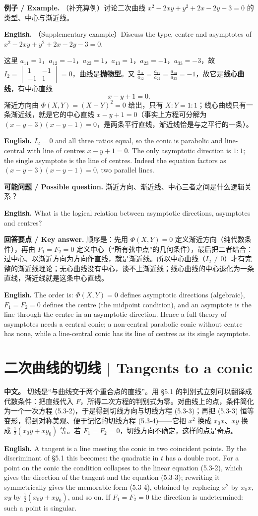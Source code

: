\documentclass[UTF8,11pt,a4paper]{ctexart}
\newcommand{\APS}[2]{\par\noindent\textbf{中文。} #1\par\noindent\textbf{English.} #2\par\smallskip}
\newcommand{\EN}[1]{\par\noindent \textbf{English.} #1\par}
\newcommand{\EX}[2]{\par\noindent \textbf{例子 / Example.} #1\par\EN{#2}}
\newcommand{\ASK}[4]{\par\noindent \textbf{可能问题 / Possible question.} #1\par\EN{#2}\noindent \textbf{回答要点 / Key answer.} #3\par\EN{#4}\medskip}
\theoremstyle{definition}
\begin{document}
\EX{（补充算例）讨论二次曲线 $x^2-2xy+y^2+2x-2y-3=0$ 的类型、中心与渐近线。}{（Supplementary example）Discuss the type, centre and asymptotes of $x^2-2xy+y^2+2x-2y-3=0$.}
这里 $a_{11}=1$，$a_{12}=-1$，$a_{22}=1$，$a_{13}=1$，$a_{23}=-1$，$a_{33}=-3$，故 $I_2=\begin{vmatrix}1&-1\\ -1&1\end{vmatrix}=0$，曲线是\textbf{抛物型}。又 $\frac{a_{11}}{a_{12}}=\frac{a_{12}}{a_{22}}=\frac{a_{13}}{a_{23}}=-1$，故它是\textbf{线心曲线}，有中心直线
\[
x-y+1=0.
\]
渐近方向由 $\Phi(X,Y)=(X-Y)^2=0$ 给出，只有 $X:Y=1:1$；线心曲线只有一条渐近线，就是它的中心直线 $x-y+1=0$（事实上方程可分解为 $(x-y+3)(x-y-1)=0$，是两条平行直线，渐近线恰是与之平行的一条）。
\EN{$I_2=0$ and all three ratios equal, so the conic is parabolic and line-central with line of centres $x-y+1=0$. The only asymptotic direction is $1:1$; the single asymptote is the line of centres. Indeed the equation factors as $(x-y+3)(x-y-1)=0$, two parallel lines.}

\ASK{渐近方向、渐近线、中心三者之间是什么逻辑关系？}{What is the logical relation between asymptotic directions, asymptotes and centres?}{顺序是：先用 $\Phi(X,Y)=0$ 定义渐近方向（纯代数条件），再由 $F_1=F_2=0$ 定义中心（``所有弦中点''的几何条件），最后把二者结合：过中心、以渐近方向为方向作直线，就是渐近线。所以中心曲线（$I_2\ne0$）才有完整的渐近线理论；无心曲线没有中心，谈不上渐近线；线心曲线的中心退化为一条直线，渐近线就是这条中心直线。}{The order is: $\Phi(X,Y)=0$ defines asymptotic directions (algebraic), $F_1=F_2=0$ defines the centre (the midpoint condition), and an asymptote is the line through the centre in an asymptotic direction. Hence a full theory of asymptotes needs a central conic; a non-central parabolic conic without centre has none, while a line-central conic has its line of centres as its single asymptote.}

\section{\label{sec:11}二次曲线的切线 | Tangents to a conic}
\APS{切线是``与曲线交于两个重合点的直线''。用 §5.1 的判别式立刻可以翻译成代数条件：把直线代入 $F$，所得二次方程的判别式为零。对曲线上的点，条件简化为一个一次方程 (5.3-2)，于是得到切线方向与切线方程 (5.3-3)；再把 (5.3-3) 恒等变形，得到对称美观、便于记忆的切线方程 (5.3-4)——它把 $x^2$ 换成 $x_0x$、$xy$ 换成 $\frac12(x_0y+xy_0)$ 等。若 $F_1=F_2=0$，切线方向不确定，这样的点是奇点。}{A tangent is a line meeting the conic in two coincident points. By the discriminant of §5.1 this becomes: the quadratic in $t$ has a double root. For a point on the conic the condition collapses to the linear equation (5.3-2), which gives the direction of the tangent and the equation (5.3-3); rewriting it symmetrically gives the memorable form (5.3-4), obtained by replacing $x^2$ by $x_0x$, $xy$ by $\frac12(x_0y+xy_0)$, and so on. If $F_1=F_2=0$ the direction is undetermined: such a point is singular.}
\end{document}
